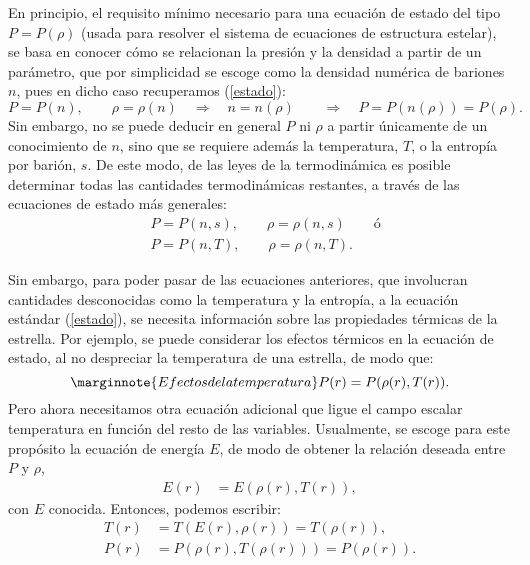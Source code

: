 En principio, el requisito mínimo necesario para una ecuación de estado del tipo $P=P(\rho)$ (usada para resolver el sistema de ecuaciones de estructura estelar), se basa en conocer cómo se relacionan la presión y la densidad a partir de un parámetro, que por simplicidad se escoge como la densidad numérica de bariones $n$, pues en dicho caso recuperamos (\ref{estado}):
\begin{equation*}
 P=P(n),\qquad\rho=\rho(n)\quad\Rightarrow\quad n=n(\rho)\qquad\Rightarrow\quad P=P(n(\rho))=P(\rho).
\end{equation*}
Sin embargo, no se puede deducir en general $P$ ni $\rho$ a partir únicamente de un conocimiento de $n$, sino que se requiere además la temperatura, $T$, o la entropía por barión, $s$. De este modo, de las leyes de la termodinámica es posible determinar todas las cantidades termodinámicas restantes, a través de las ecuaciones de estado más generales:
\begin{align}\label{estadogeneral}
 &P=P(n,s),\qquad\rho=\rho(n,s)\qquad\text{ó}\\
&P=P(n,T),\qquad\rho=\rho(n,T).
\end{align}

Sin embargo, para poder pasar de las ecuaciones anteriores, que involucran cantidades desconocidas como la temperatura  y la entropía, a la ecuación estándar (\ref{estado}), se necesita información sobre las propiedades térmicas de la estrella. Por ejemplo, se puede considerar los efectos térmicos en la ecuación de estado, al no  despreciar la temperatura de una estrella, de modo que:
\begin{equation}\marginnote{Efectos de la temperatura}
 P(r)=P(\rho(r),T(r)).
\end{equation}
Pero ahora necesitamos otra ecuación adicional que ligue el campo escalar temperatura en función del resto de las variables. Usualmente, se escoge para este propósito la ecuación de energía $E$, de modo de obtener la relación deseada entre $P$ y $\rho$,
\begin{align}
 E(r)&=E(\rho(r),T(r)),
\end{align}
con $E$ conocida. Entonces, podemos escribir:
\begin{align}
T(r)&=T(E(r),\rho(r))=T(\rho(r)),\\
P(r)&=P(\rho(r),T(\rho(r)))=P(\rho(r)).
\end{align}

